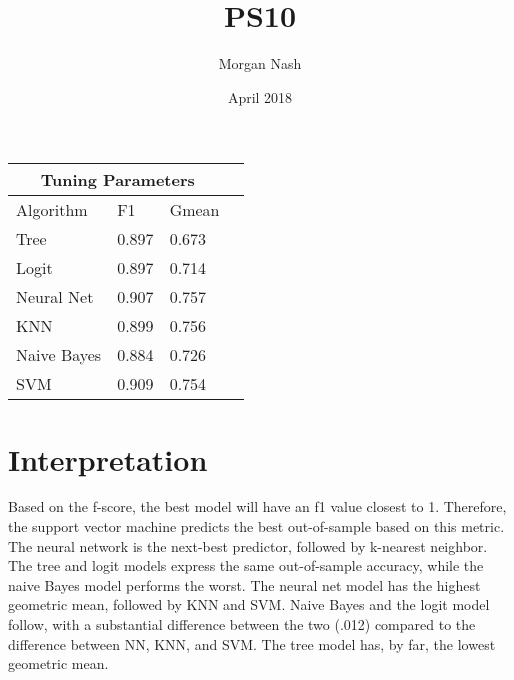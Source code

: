 \documentclass{article}
\title{PS10}
\author{Morgan Nash }
\date{April 2018}
\begin{document}
\maketitle

\begin{tabular}{ |p{3cm}||p{3cm}|p{3cm}|p{3cm}|  }
 \hline
 \multicolumn{3}{|c|}{Tuning Parameters} \\
 \hline
 Algorithm    & F1 &Gmean\\
 \hline
 Tree  & 0.897    &0.673\\
 Logit&   0.897  & 0.714\\
 Neural Net &0.907 & 0.757\\
 KNN   &0.899 & 0.756\\
 Naive Bayes&   0.884 & 0.726\\
 SVM& 0.909  & 0.754 \\
 \hline
\end{tabular}

\section{Interpretation}
Based on the f-score, the best model will have an f1 value closest to 1. Therefore, the support vector machine predicts the best out-of-sample based on this metric. The neural network is the next-best predictor, followed by k-nearest neighbor. The tree and logit models express the same out-of-sample accuracy, while the naive Bayes model performs the worst. The neural net model has the highest geometric mean, followed by KNN and SVM. Naive Bayes and the logit model follow, with a substantial difference between the two (.012) compared to the difference between NN, KNN, and SVM. The tree model has, by far, the lowest geometric mean.
\end{document}
